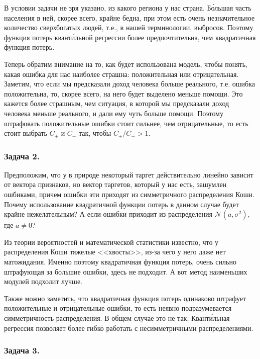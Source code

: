 \begin{solution}
    В условии задачи не зря указано, из какого региона у нас страна. Б\'{о}льшая часть населения в ней, скорее всего, крайне бедна, при этом есть очень незначительное количество сверхбогатых людей, т.е., в нашей терминологии, выбросов. Поэтому функция потерь квант\'{и}льной регрессии более предпочтительна, чем квадратичная функция потерь.

    Теперь обратим внимание на то, как будет использована модель, чтобы понять, какая ошибка для нас наиболее страшна: положительная или отрицательная. Заметим, что если мы предсказали доход человека больше реального, т.е. ошибка положительна, то, скорее всего, на него будет выделено меньше помощи. Это кажется более страшным, чем ситуация, в которой мы предсказали доход человека меньше реального, и дали ему чуть больше помощи. Поэтому штрафовать положительные ошибки стоит сильнее, чем отрицательные, то есть стоит выбрать $C_+$ и $C_-$ так, чтобы $C_+/C_- > 1$.
\end{solution}

\subsubsection*{Задача 2.}

Предположим, что у в природе некоторый таргет действительно линейно зависит от вектора признаков, но вектор таргетов, который у нас есть, зашумлен ошбиками, причем ошибки эти приходят из симметричного распределения Коши. Почему использование квадратичной функции потерь в данном случае будет крайне нежелательным? А если ошибки приходит из распределения $\mathcal{N}(a, \sigma^2)$, где $a \neq 0$?

\begin{solution}
    Из теории вероятностей и математической статистики известно, что у распределения Коши тяжелые <<хвосты>>, из-за чего у него даже нет матожидания. Именно поэтому квадратичная функция потерь, очень сильно штрафующая за большие ошибки, здесь не подходит. А вот метод наименьших модулей подхолит лучше.

    Также можно заметить, что квадратичная функция потерь одинаково штрафует положительные и отрицательные ошибки, то есть неявно подразумевается симметричность распределения. В общем случае это не так. Квант\'{и}льная регрессия позволяет более гибко работать с несимметричными распределениями.
\end{solution}

\subsubsection*{Задача 3.}

